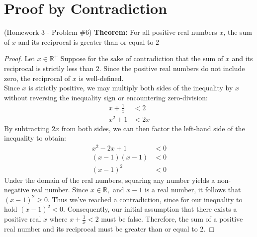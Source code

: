 \documentclass[12pt]{amsart}
\newcommand{\R}{\ensuremath{\mathbb{R}}}
\begin{document}
\section{Proof by Contradiction}
{(Homework $3$ - Problem $\#6$) }
\textbf{Theorem:}{ For all positive real numbers $x$, the sum of $x$ and its reciprocal is greater than or equal to $2$}
\begin{proof}
     Let $x \in \R^+$ Suppose for the sake of contradiction that the sum of $x$ and its reciprocal is strictly less than $2$. Since the positive real numbers do not include zero, the reciprocal of $x$ is well-defined. \\
       Since $x$ is strictly positive, we may multiply both sides of the inequality by $x$ without reversing the inequality sign or encountering zero-division:
     \begin{align*}
     x+\frac{1}{x} &<2\\
     x^2 + 1 &< 2x 
     \end{align*}
     By subtracting $2x$ from both sides, we can then factor the left-hand side of the inequality to obtain:
     \begin{align*}
     x^2 -2x+1 &< 0 \\
     (x-1)(x-1) &< 0 \\
     (x-1)^2 &< 0
     \end{align*}
     Under the domain of the real numbers, squaring any number yields a non-negative real number. Since $x \in \R,$ and $x-1$ is a real number, it follows that $(x-1)^2 \ge 0$. Thus we've reached a contradiction, since for our inequality to hold $(x-1)^2 < 0$. Consequently, our initial assumption that there exists a positive real $x$ where $x +\frac{1}{x} < 2$ must be false. Therefore, the sum of a positive real number and its reciprocal must be greater than or equal to 2.
\end{proof}
\newpage
\end{document}
